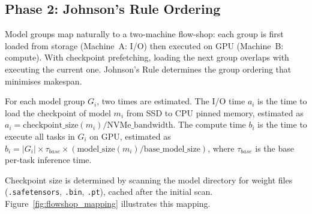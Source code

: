 \documentclass[logo,bsc,singlespacing,parskip,online]{infthesis}
\begin{document}
\subsection{Phase 2: Johnson's Rule Ordering}
\label{sec:johnsons_rule}

Model groups map naturally to a two-machine flow-shop: each group is first loaded from storage (Machine~A: I/O) then executed on GPU (Machine~B: compute). With checkpoint prefetching, loading the next group overlaps with executing the current one. Johnson's Rule determines the group ordering that minimises makespan.

For each model group $G_i$, two times are estimated. The I/O time $a_i$ is the time to load the checkpoint of model $m_i$ from SSD to CPU pinned memory, estimated as $a_i = \text{checkpoint\_size}(m_i) / \text{NVMe\_bandwidth}$. The compute time $b_i$ is the time to execute all tasks in $G_i$ on GPU, estimated as $b_i = |G_i| \times \tau_{base} \times (\text{model\_size}(m_i) / \text{base\_model\_size})$, where $\tau_{base}$ is the base per-task inference time.

Checkpoint size is determined by scanning the model directory for weight files (\texttt{.safetensors}, \texttt{.bin}, \texttt{.pt}), cached after the initial scan. Figure~\ref{fig:flowshop_mapping} illustrates this mapping.
\end{document}
